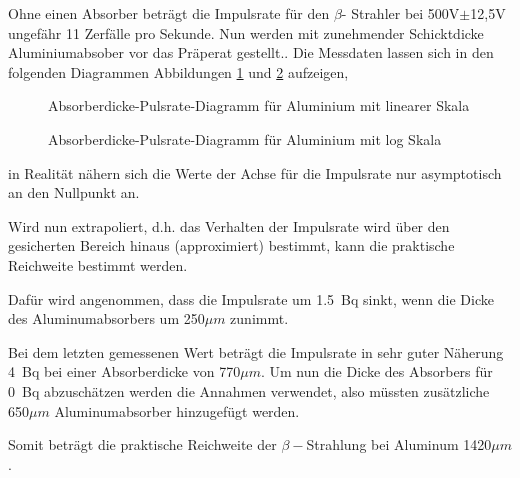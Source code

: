 Ohne einen Absorber beträgt die Impulsrate für den $\beta$- Strahler
bei 500V$\pm$12,5V ungefähr 11 Zerfälle pro Sekunde. Nun werden mit
zunehmender Schicktdicke Aluminiumabsober vor das Präperat gestellt..
Die Messdaten lassen sich in den folgenden Diagrammen Abbildungen \ref{fig:alu_lin} und \ref{fig:alu_log} aufzeigen,

\begin{figure}[h!]
\centering

\caption{Absorberdicke-Pulsrate-Diagramm für Aluminium mit linearer Skala}
\label{fig:alu_lin}
\end{figure}

\begin{figure}[h!]
\centering

\caption{Absorberdicke-Pulsrate-Diagramm für Aluminium mit log Skala}
\label{fig:alu_log}
\end{figure}

in Realität nähern sich die Werte der Achse für die Impulsrate nur
asymptotisch an den Nullpunkt an.

Wird nun extrapoliert, d.h. das Verhalten der Impulsrate wird über
den gesicherten Bereich hinaus (approximiert) bestimmt, kann die praktische
Reichweite bestimmt werden. 

Dafür wird angenommen, dass die Impulsrate um \SI{1.5}{\becquerel}
sinkt, wenn die Dicke des Aluminumabsorbers um 250$\mu m$ zunimmt. 

Bei dem letzten gemessenen Wert beträgt die Impulsrate in sehr guter
Näherung \SI{4}{\becquerel} bei einer Absorberdicke
von 770$\mu m$. Um nun die Dicke des Absorbers für \SI{0}{\becquerel}
abzuschätzen werden die Annahmen verwendet, also müssten zusätzliche
650$\mu m$ Aluminumabsorber hinzugefügt werden.

Somit beträgt die praktische Reichweite der $\beta-$Strahlung bei
Aluminum 1420$\mu m$.

